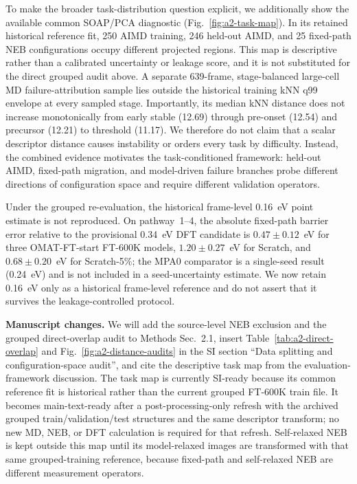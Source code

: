 To make the broader task-distribution question explicit, we additionally show the available common SOAP/PCA diagnostic (Fig.~\ref{fig:a2-task-map}). In its retained historical reference fit, 250 AIMD training, 246 held-out AIMD, and 25 fixed-path NEB configurations occupy different projected regions. This map is descriptive rather than a calibrated uncertainty or leakage score, and it is not substituted for the direct grouped audit above. A separate 639-frame, stage-balanced large-cell MD failure-attribution sample lies outside the historical training kNN q99 envelope at every sampled stage. Importantly, its median kNN distance does not increase monotonically from early stable (12.69) through pre-onset (12.54) and precursor (12.21) to threshold (11.17). We therefore do not claim that a scalar descriptor distance causes instability or orders every task by difficulty. Instead, the combined evidence motivates the task-conditioned framework: held-out AIMD, fixed-path migration, and model-driven failure branches probe different directions of configuration space and require different validation operators.

Under the grouped re-evaluation, the historical frame-level 0.16~eV point estimate is not reproduced. On pathway~1--4, the absolute fixed-path barrier error relative to the provisional 0.34~eV DFT candidate is $0.47\pm0.12$~eV for three OMAT-FT-start FT-600K models, $1.20\pm0.27$~eV for Scratch, and $0.68\pm0.20$~eV for Scratch-5\%; the MPA0 comparator is a single-seed result (0.24~eV) and is not included in a seed-uncertainty estimate. We now retain 0.16~eV only as a historical frame-level reference and do not assert that it survives the leakage-controlled protocol.

\noindent\textbf{Manuscript changes.}
We will add the source-level NEB exclusion and the grouped direct-overlap audit to Methods Sec.~2.1, insert Table~\ref{tab:a2-direct-overlap} and Fig.~\ref{fig:a2-distance-audits} in the SI section ``Data splitting and configuration-space audit'', and cite the descriptive task map from the evaluation-framework discussion. The task map is currently SI-ready because its common reference fit is historical rather than the current grouped FT-600K train file. It becomes main-text-ready after a post-processing-only refresh with the archived grouped train/validation/test structures and the same descriptor transform; no new MD, NEB, or DFT calculation is required for that refresh. Self-relaxed NEB is kept outside this map until its model-relaxed images are transformed with that same grouped-training reference, because fixed-path and self-relaxed NEB are different measurement operators.

